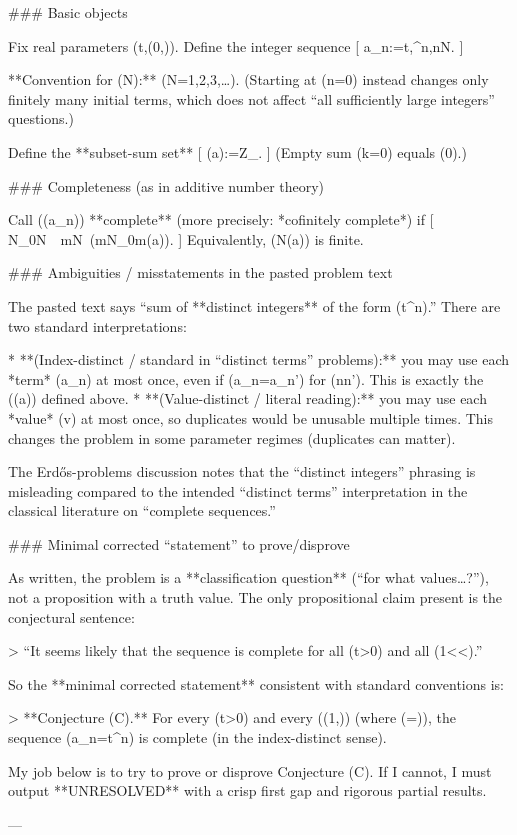 ### Basic objects

Fix real parameters (t,\alpha\in(0,\infty)). Define the integer sequence
[
a_n:=\big\lfloor t,\alpha^n\big\rfloor,\qquad n\in\mathbb N.
]

**Convention for (\mathbb N):** (\mathbb N={1,2,3,\dots}).
(Starting at (n=0) instead changes only finitely many initial terms, which does not affect “all sufficiently large integers” questions.)

Define the **subset-sum set**
[
\Sigma(a):=\subseteq\mathbb Z_{}.
]
(Empty sum (k=0) equals (0).)

### Completeness (as in additive number theory)

Call ((a_n)) **complete** (more precisely: *cofinitely complete*) if
[
\exists N_0\in\mathbb N\ \ \forall m\in\mathbb N\ (m\ge N_0\implies m\in \Sigma(a)).
]
Equivalently, (\mathbb N\setminus \Sigma(a)) is finite.

### Ambiguities / misstatements in the pasted problem text

The pasted text says “sum of **distinct integers** of the form (\lfloor t\alpha^n\rfloor).” There are two standard interpretations:

* **(Index-distinct / standard in “distinct terms” problems):** you may use each *term* (a_n) at most once, even if (a_n=a_{n'}) for (n\neq n'). This is exactly the (\Sigma(a)) defined above.
* **(Value-distinct / literal reading):** you may use each *value* (v) at most once, so duplicates would be unusable multiple times. This changes the problem in some parameter regimes (duplicates can matter).

The Erdős-problems discussion notes that the “distinct integers” phrasing is misleading compared to the intended “distinct terms” interpretation in the classical literature on “complete sequences.”

### Minimal corrected “statement” to prove/disprove

As written, the problem is a **classification question** (“for what values…?”), not a proposition with a truth value. The only propositional claim present is the conjectural sentence:

> “It seems likely that the sequence is complete for all (t>0) and all (1<\alpha<).”

So the **minimal corrected statement** consistent with standard conventions is:

> **Conjecture (C).** For every (t>0) and every (\alpha\in(1,\varphi)) (where (\varphi=)), the sequence (a_n=\lfloor t\alpha^n\rfloor) is complete (in the index-distinct sense).

My job below is to try to prove or disprove Conjecture (C). If I cannot, I must output **UNRESOLVED** with a crisp first gap and rigorous partial results.

---
